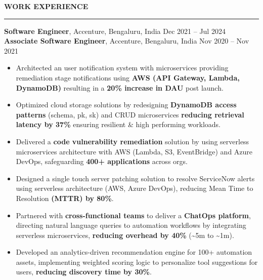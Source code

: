 \documentclass[letterpaper,10.5pt]{extarticle}
\newcommand{\resumesection}[1]{%
    \vspace{6pt}%
    \noindent\textbf{#1}\vspace{-5pt}%
    \\\noindent\rule{\textwidth}{0.5pt}%
    \vspace{1pt}%
}
\begin{document}
\resumesection{WORK EXPERIENCE}

\noindent\textbf{Software Engineer}, Accenture, Bengaluru, India \hfill Dec 2021 -- Jul 2024\\
\textbf{Associate Software Engineer}, Accenture, Bengaluru, India \hfill Nov 2020 -- Nov 2021

\begin{itemize}[leftmargin=12pt, topsep=1pt, itemsep=0pt, parsep=0pt]
    \item Architected an user notification system with microservices providing remediation stage notifications using \textbf{AWS (API Gateway, Lambda, DynamoDB)} resulting in a \textbf{20\% increase in DAU} post launch.
    \item Optimized cloud storage solutions by redesigning \textbf{DynamoDB access patterns} (schema, pk, sk) and CRUD microservices \textbf{reducing retrieval latency by 37\%} ensuring resilient \& high performing workloads.
    \item Delivered a \textbf{code vulnerability remediation} solution by using serverless microservices architecture with AWS (Lambda, S3, EventBridge) and Azure DevOps, safeguarding \textbf{400+ applications} across orgs.
    \item Designed a single touch server patching solution to resolve ServiceNow alerts using serverless architecture (AWS, Azure DevOps), reducing Mean Time to Resolution \textbf{(MTTR) by 80\%}.
    \item Partnered with \textbf{cross-functional teams} to deliver a \textbf{ChatOps platform}, directing natural language queries to automation workflows by integrating serverless microservices, \textbf{reducing overhead by 40\%} (\textasciitilde5m to \textasciitilde1m).
    \item Developed an analytics-driven recommendation engine for 100+ automation assets, implementing weighted scoring logic to personalize tool suggestions for users, \textbf{reducing discovery time by 30\%}.
\end{itemize}
\end{document}
